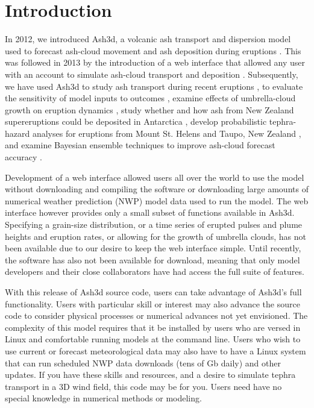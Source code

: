 \chapter{Introduction}\label{ChapIntro}
In 2012, we introduced Ash3d, a volcanic ash transport and dispersion model
used to forecast ash-cloud movement and ash deposition during eruptions \cite{Schwaiger2012}.
This was followed in 2013 by the introduction of a web interface that allowed any user
with an account to simulate ash-cloud transport and deposition \cite{Mastin2013b}.
Subsequently, we have used Ash3d to study ash transport during recent
eruptions \cite{Mastin2013a}, to evaluate the sensitivity of model inputs to
outcomes \cite{Mastin2016}, examine effects of umbrella-cloud growth on eruption
dynamics \cite{Mastin2014,Mastin2020a}, study whether and how ash from New Zealand
supereruptions could be deposited in Antarctica \cite{Dunbar2017}, develop
probabilistic tephra-hazard analyses for eruptions from Mount St. Helens \cite{Mastin2020b}
and Taupo, New Zealand \cite{Barker2019}, and examine Bayesian ensemble techniques
to improve ash-cloud forecast accuracy \cite{Denlinger2012}.

Development of a web interface allowed users all over the world to use the model
without downloading and compiling the software or downloading large amounts of
numerical weather prediction (NWP) model data used to run the model. The web
interface however provides only a small subset of functions available in Ash3d.
Specifying a grain-size distribution, or a time series of erupted pulses and
plume heights and eruption rates, or allowing for the growth of umbrella clouds,
has not been available due to our desire to keep the web interface simple.
Until recently, the software has
also not been available for download, meaning that only model developers and their
close collaborators have had access the full suite of features.

With this release of Ash3d source code, users can take advantage of Ash3d's full
functionality. Users with particular skill or interest may also advance the
source code to consider physical processes or numerical advances not yet envisioned.
The complexity of this model requires that it be installed by users who are versed
in Linux and comfortable running models at the command line. Users who wish to use
current or forecast meteorological data may also have to have a Linux system that
can run scheduled NWP data downloads (tens of Gb daily) and other updates. If you
have these skills and resources, and a desire to simulate tephra transport in a 3D
wind field, this code may be for you. Users need have no special knowledge in
numerical methods or modeling.

